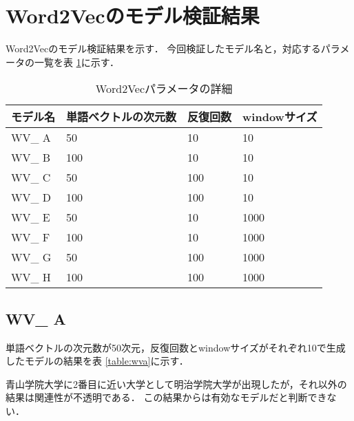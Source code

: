 \section{Word2Vecのモデル検証結果}
Word2Vecのモデル検証結果を示す．
今回検証したモデル名と，対応するパラメータの一覧を表 \ref{table:wvResultAll}に示す．

\begin{table}[htbp]
\caption{Word2Vecパラメータの詳細}
\centering
\begin{tabular}{llll}
\hline
モデル名 & 単語ベクトルの次元数 & 反復回数 & windowサイズ
\\ \hline \hline
WV\_ A & 50 & 10 & 10\\ \hline
WV\_ B & 100 & 10 & 10\\ \hline
WV\_ C & 50 & 100 & 10\\ \hline
WV\_ D & 100 & 100 & 10\\ \hline
WV\_ E & 50 & 10 & 1000\\ \hline
WV\_ F & 100 & 10 & 1000\\ \hline
WV\_ G & 50 & 100 & 1000\\ \hline
WV\_ H & 100 & 100 & 1000\\ \hline
\end{tabular}
\label{table:wvResultAll}
\end{table}

\subsection{WV\_ A}
単語ベクトルの次元数が50次元，反復回数とwindowサイズがそれぞれ10で生成したモデルの結果を表 \ref{table:wva}に示す．

青山学院大学に2番目に近い大学として明治学院大学が出現したが，それ以外の結果は関連性が不透明である．
この結果からは有効なモデルだと判断できない．

